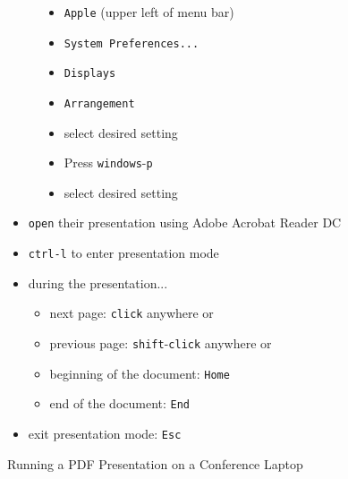 \documentclass{scrartcl}
\begin{document}
\begin{figure}[h] 
\caption{Working with Computer Display Settings}
\begin{subfigure}[t]{0.5\textwidth}
\begin{itemize}
\item \texttt{Apple} (upper left of menu bar)
\item \texttt{System Preferences...}
\item \texttt{Displays}
\item \texttt{Arrangement}
\item select desired setting
\end{itemize}
\end{subfigure}%
\hfill
\begin{subfigure}[t]{0.5\textwidth}
\begin{itemize}
\item Press \texttt{windows}-\texttt{p}
\item select desired setting
\end{itemize}
\end{subfigure}
\label{fig:display_settings}
\addtocounter{figure}{-1} 
\end{figure}

\begin{figure}[h] 
\caption{Running a PDF Presentation on a Conference Laptop}
\begin{itemize}
\item \texttt{open} their presentation using Adobe Acrobat Reader DC
\item \texttt{ctrl-l} to enter presentation mode
\item during the presentation...
\begin{itemize}
	\item next page: \texttt{click} anywhere or \texttt{\textrightarrow}
	\item previous page: \texttt{shift}-\texttt{click} anywhere or \texttt{\textleftarrow}
	\item beginning of the document: \texttt{Home}
	\item end of the document: \texttt{End}
\end{itemize}
\item exit presentation mode: \texttt{Esc}
\end{itemize}
\label{fig:pdf_presentation}
\end{figure}
\end{document}
